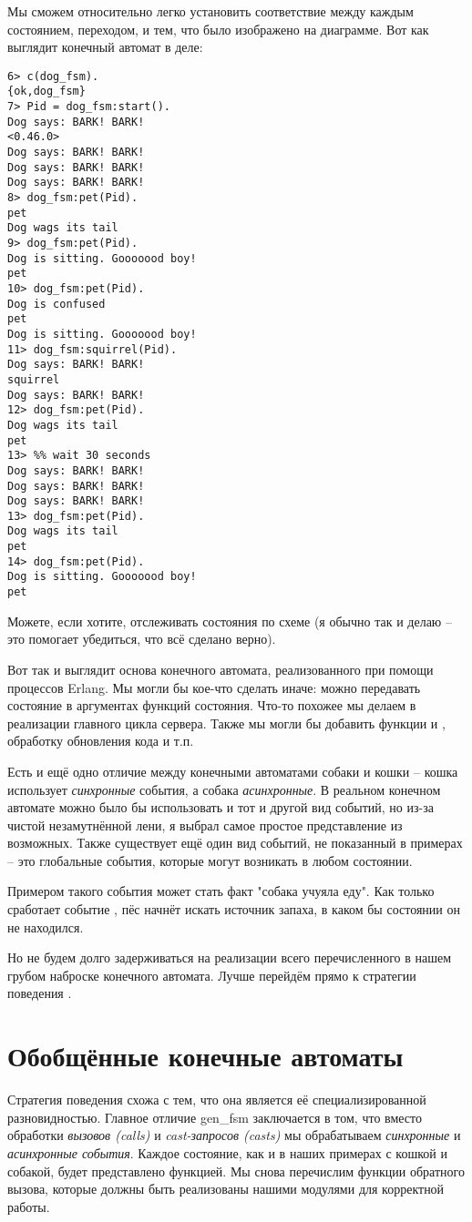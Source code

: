 Мы сможем относительно легко установить соответствие между каждым состоянием, переходом, и тем, что было изображено на диаграмме.
Вот как выглядит конечный автомат в деле:
\begin{lstlisting}[style=erlang]
6> c(dog_fsm).
{ok,dog_fsm}
7> Pid = dog_fsm:start().
Dog says: BARK! BARK!
<0.46.0>
Dog says: BARK! BARK!
Dog says: BARK! BARK!
Dog says: BARK! BARK!
8> dog_fsm:pet(Pid).
pet
Dog wags its tail
9> dog_fsm:pet(Pid).
Dog is sitting. Gooooood boy!
pet
10> dog_fsm:pet(Pid).
Dog is confused
pet
Dog is sitting. Gooooood boy!
11> dog_fsm:squirrel(Pid).
Dog says: BARK! BARK!
squirrel
Dog says: BARK! BARK!   
12> dog_fsm:pet(Pid).
Dog wags its tail
pet
13> %% wait 30 seconds
Dog says: BARK! BARK!
Dog says: BARK! BARK!
Dog says: BARK! BARK!    
13> dog_fsm:pet(Pid).    
Dog wags its tail
pet
14> dog_fsm:pet(Pid).
Dog is sitting. Gooooood boy!
pet
\end{lstlisting}

Можете, если хотите, отслеживать состояния по схеме (я обычно так и делаю \--- это помогает убедиться, что всё сделано верно).

Вот так и выглядит основа конечного автомата, реализованного при помощи процессов Erlang.
Мы могли бы кое\--что сделать иначе: можно передавать состояние в аргументах функций состояния.
Что\--то похожее мы делаем в реализации главного цикла сервера.
Также мы могли бы добавить функции  и , обработку обновления кода и т.п.

Есть и ещё одно отличие между конечными автоматами собаки и кошки \--- кошка использует \emph{синхронные} события, а собака \emph{асинхронные}.
В реальном конечном автомате можно было бы использовать и тот и другой вид событий, но из\--за чистой незамутнённой лени, я выбрал самое простое представление из возможных.
Также существует ещё один вид событий, не показанный в примерах \--- это глобальные события, которые могут возникать в любом состоянии.

Примером такого события может стать факт "собака учуяла еду".
Как только сработает событие , пёс начнёт искать источник запаха, в каком бы состоянии он не находился. 

Но не будем долго задерживаться на реализации всего перечисленного в нашем грубом наброске конечного автомата.
Лучше перейдём прямо к стратегии поведения .
\section{Обобщённые конечные автоматы}
\label{generic-finite-state-machines}
Стратегия поведения  схожа с  тем, что она является её специализированной разновидностью.
Главное отличие gen\_fsm заключается в том, что вместо обработки \emph{вызовов (calls)} и \emph{cast-запросов (casts)} мы обрабатываем \emph{синхронные} и \emph{асинхронные события}.
Каждое состояние, как и в наших примерах с кошкой и собакой, будет представлено функцией.
Мы снова перечислим функции обратного вызова, которые должны быть реализованы нашими модулями для корректной работы.
